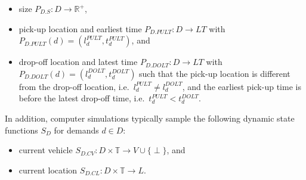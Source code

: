 \documentclass[graybox]{svmult}
\begin{document}
\begin{itemize}
	\item size $P_{D.S}: D \rightarrow \mathbb{R}^+$,
	\item pick-up location and earliest time $P_{D.PULT}: D \rightarrow LT$ with $P_{D.PULT}(d) = (l_d^{PULT},t_d^{PULT})$, and
	\item drop-off location and latest time $P_{D.DOLT}: D \rightarrow LT$ with $P_{D.DOLT}(d) = (l_d^{DOLT},t_d^{DOLT})$ such that the pick-up location is different from the drop-off location, i.e.\ $l_d^{PULT} \neq l_d^{DOLT}$, and the earliest pick-up time is before the latest drop-off time, i.e.\ $t_d^{PULT} < t_d^{DOLT}$.
\end{itemize}
In addition, computer simulations typically sample the following dynamic state functions $S_{D}$ for demands $d \in D$:
\begin{itemize}
	\item current vehicle $S_{D.CV}: D \times \mathbb{T} \rightarrow V \cup \{\perp\}$, and
	\item current location $S_{D.CL}: D \times \mathbb{T} \rightarrow L$.
\end{itemize}

\end{document}
